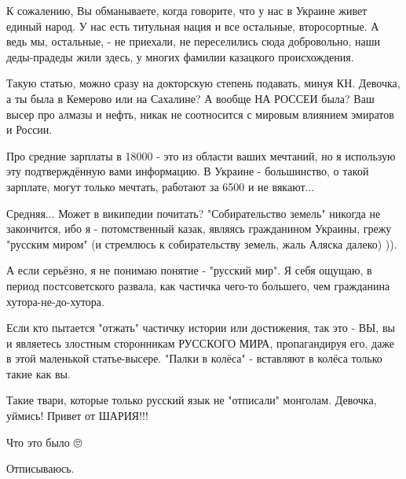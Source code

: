 \begin{itemize}
К сожалению, Вы обманываете, когда говорите, что у нас в Украине живет единый
народ. У нас есть титульная нация и все остальные, второсортные. А ведь мы,
остальные, - не приехали, не переселились сюда добровольно, наши деды-прадеды
жили здесь, у многих фамилии казацкого происхождения.

 

Такую статью, можно сразу на докторскую степень подавать, минуя КН. Девочка, а
ты была в Кемерово или на Сахалине? А вообще НА РОССЕИ была? Ваш высер про
алмазы и нефть, никак не соотносится с мировым влиянием эмиратов и России. 

Про средние зарплаты в 18000 - это из области ваших мечтаний, но я использую
эту подтверждённую вами информацию. В Украине - большинство, о такой зарплате,
могут только мечтать, работают за 6500 и не вякают... 

Средняя... Может в википедии почитать? "Собирательство земель" никогда не
закончится, ибо я - потомственный казак, являясь гражданином Украины, грежу
"русским миром" (и стремлюсь к собирательству земель, жаль Аляска далеко) )). 

А если серьёзно, я не понимаю понятие - "русский мир". Я себя ощущаю, в период
постсоветского развала, как частичка чего-то большего, чем гражданина
хутора-не-до-хутора.

Если кто пытается "отжать" частичку истории или достижения, так это - ВЫ, вы и
являетесь злостным сторонникам РУССКОГО МИРА, пропагандируя его, даже в этой
маленькой статье-высере. "Палки в колёса" - вставляют в колёса только такие как
вы. 

Такие твари, которые только русский язык не "отписали" монголам. Девочка,
уймись! Привет от ШАРИЯ!!!

 
Что это было 🙄

 
Отписываюсь.

\begin{itemize}
 

\end{itemize}
\end{itemize}

